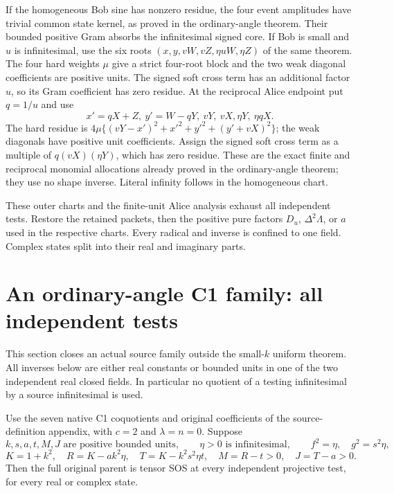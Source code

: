 If the homogeneous Bob sine has nonzero residue, the four event
amplitudes have trivial common state kernel, as proved in the
ordinary-angle theorem. Their bounded positive Gram absorbs the
infinitesimal signed core. If Bob is small and $u$ is infinitesimal,
use the six roots
$(x,y,vW,vZ,\eta uW,\eta Z)$ of the same theorem. The four hard
weights $\mu$ give a strict four-root block and the two weak diagonal
coefficients are positive units. The signed soft cross term has an
additional factor $u$, so its Gram coefficient has zero residue.
At the reciprocal Alice endpoint put $q=1/u$ and use
\[
                x'=qX+Z,\ y'=W-qY,\ vY,\ vX,
                       \eta Y,\ \eta qX.
\]
The hard residue is
$4\mu\{(vY-x')^2+x'^2+y'^2+(y'+vX)^2\}$;
the weak diagonals have positive unit coefficients. Assign the signed
soft cross term as a multiple of $q(vX)(\eta Y)$, which has zero
residue. These are the exact finite and reciprocal monomial
allocations already proved in the ordinary-angle theorem; they use
no shape inverse. Literal infinity follows in the homogeneous chart.

These outer charts and the finite-unit Alice analysis exhaust all
independent tests. Restore the retained packets, then the positive
pure factors $D_u$, $\Delta^2\Lambda$, or $a$ used in the respective
charts. Every radical and inverse is confined to one field. Complex
states split into their real and imaginary parts.



\section{\texorpdfstring{An ordinary-angle C1 family: all independent tests}{An ordinary-angle C1 family: all independent tests}}
\label{component:p18a57c9c271d}

\label{p18a57c9c271d:sec:c1-ordinary-angle}

This section closes an actual source family outside the small-$k$
uniform theorem. All inverses below are either real constants or
bounded units in one of the two independent real closed fields.
In particular no quotient of a testing infinitesimal by a source
infinitesimal is used.

\begin{theorem}
\label{p18a57c9c271d:thm:c1-ordinary-angle}
Use the seven native C1 coquotients and original coefficients of
the source-definition appendix, with $c=2$ and $\lambda=n=0$.
Suppose
\[
 k,s,a,t,M,J\text{ are positive bounded units},\qquad
 \eta>0\text{ is infinitesimal},\qquad
 f^2=\eta,\quad g^2=s^2\eta,
\]
\[
 K=1+k^2,\quad R=K-ak^2\eta,\quad T=K-k^2s^2\eta t,
 \quad M=R-t>0,\quad J=T-a>0.                 \tag{OA1}
\]
Then the full original parent is tensor SOS at every independent
projective test, for every real or complex state.
\end{theorem}

